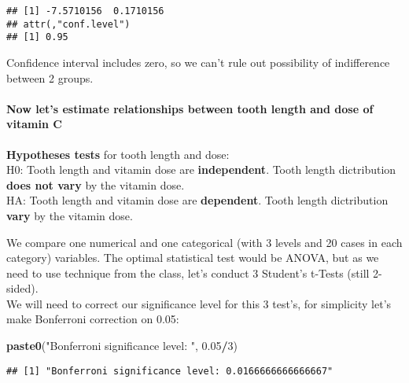 \documentclass[]{article}
\newenvironment{Shaded}{\begin{snugshade}}{\end{snugshade}}
\newcommand{\KeywordTok}[1]{\textcolor[rgb]{0.13,0.29,0.53}{\textbf{#1}}}
\newcommand{\DecValTok}[1]{\textcolor[rgb]{0.00,0.00,0.81}{#1}}
\newcommand{\FloatTok}[1]{\textcolor[rgb]{0.00,0.00,0.81}{#1}}
\newcommand{\StringTok}[1]{\textcolor[rgb]{0.31,0.60,0.02}{#1}}
\newcommand{\OperatorTok}[1]{\textcolor[rgb]{0.81,0.36,0.00}{\textbf{#1}}}
\newcommand{\NormalTok}[1]{#1}
\let\oldparagraph\paragraph
\renewcommand{\paragraph}[1]{\oldparagraph{#1}\mbox{}}
\begin{document}
\begin{verbatim}
## [1] -7.5710156  0.1710156
## attr(,"conf.level")
## [1] 0.95
\end{verbatim}

Confidence interval includes zero, so we can't rule out possibility of
indifference between 2 groups.

\paragraph{Now let's estimate relationships between tooth length and
dose of vitamin
C}\label{now-lets-estimate-relationships-between-tooth-length-and-dose-of-vitamin-c}

\textbf{Hypotheses tests} for tooth length and dose:\\
H0: Tooth length and vitamin dose are \textbf{independent}. Tooth length
dictribution \textbf{does not vary} by the vitamin dose.\\
HA: Tooth length and vitamin dose are \textbf{dependent}. Tooth length
dictribution \textbf{vary} by the vitamin dose.

We compare one numerical and one categorical (with 3 levels and 20 cases
in each category) variables. The optimal statistical test would be
ANOVA, but as we need to use technique from the class, let's conduct 3
Student's t-Tests (still 2-sided).\\
We will need to correct our significance level for this 3 test's, for
simplicity let's make Bonferroni correction on 0.05:

\begin{Shaded}
\begin{Highlighting}[]
\KeywordTok{paste0}\NormalTok{(}\StringTok{"Bonferroni significance level: "}\NormalTok{, }\FloatTok{0.05}\OperatorTok{/}\DecValTok{3}\NormalTok{)}
\end{Highlighting}
\end{Shaded}

\begin{verbatim}
## [1] "Bonferroni significance level: 0.0166666666666667"
\end{verbatim}
\end{document}
